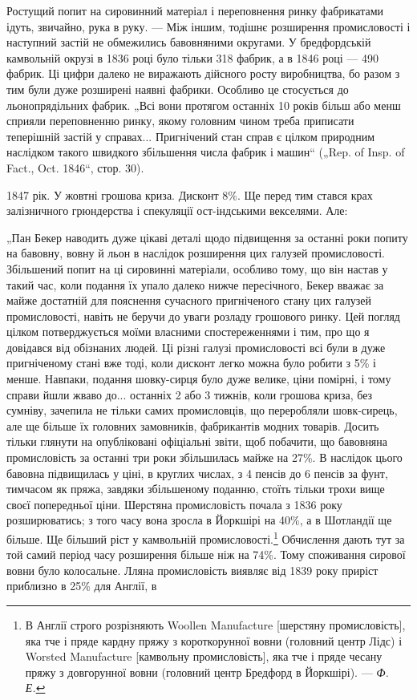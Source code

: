
Ростущий попит на сировинний матеріал і переповнення
ринку фабрикатами ідуть, звичайно, рука в руку. — Між іншим,
тодішнє розширення промисловості і наступний застій не обмежились
бавовняними округами. У бредфордській камвольній
окрузі в 1836 році було тільки 318 фабрик, а в 1846 році —
490 фабрик. Ці цифри далеко не виражають дійсного росту
виробництва, бо разом з тим були дуже розширені наявні фабрики.
Особливо це стосується до льонопрядільних фабрик. „Всі
вони протягом останніх 10 років більш або менш сприяли переповненню
ринку, якому головним чином треба приписати теперішній
застій у справах... Пригнічений стан справ є цілком природним
наслідком такого швидкого збільшення числа фабрик
і машин“ („Rep. of Insp. of Fact., Oct. 1846“, стор. 30).

1847 рік. У жовтні грошова криза. Дисконт 8\%. Ще перед
тим стався крах залізничного грюндерства і спекуляції ост-індськими
векселями. Але:

„Пан Бекер наводить дуже цікаві деталі щодо підвищення
за останні роки попиту на бавовну, вовну й льон в наслідок
розширення цих галузей промисловості. Збільшений попит на ці
сировинні матеріали, особливо тому, що він настав у такий час,
коли подання їх упало далеко нижче пересічного, Бекер вважає
за майже достатній для пояснення сучасного пригніченого стану
цих галузей промисловості, навіть не беручи до уваги розладу
грошового ринку. Цей погляд цілком потверджується моїми
власними спостереженнями і тим, про що я довідався від обізнаних
людей. Ці різні галузі промисловості всі були в дуже
пригніченому стані вже тоді, коли дисконт легко можна було
робити з 5\% і менше. Навпаки, подання шовку-сирця було дуже
велике, ціни помірні, і тому справи йшли жваво до... останніх
2 або 3 тижнів, коли грошова криза, без сумніву, зачепила не
тільки самих промисловців, що переробляли шовк-сирець, але
ще більше їх головних замовників, фабрикантів модних товарів.
Досить тільки глянути на опубліковані офіціальні звіти, щоб побачити,
що бавовняна промисловість за останні три роки збільшилась
майже на 27\%. В наслідок цього бавовна підвищилась
у ціні, в круглих числах, з 4 пенсів до 6 пенсів за фунт, тимчасом
як пряжа, завдяки збільшеному поданню, стоїть тільки
трохи вище своєї попередньої ціни. Шерстяна промисловість почала
з 1836 року розширюватись; з того часу вона зросла в
Йоркшірі на 40\%, а в Шотландії ще більше. Ще більший ріст
у камвольній промисловості.\footnote{
В Англії строго розрізняють Woollen Manufacture [шерстяну промисловість],
яка тче і пряде кардну пряжу з короткорунної вовни (головний центр Лідс)
і Worsted Manufacture [камвольну промисловість], яка тче і пряде чесану пряжу
з довгорунної вовни (головний центр Бредфорд в Йоркшірі). — \emph{Ф. Е.}
} Обчислення дають тут за той
самий період часу розширення більше ніж на 74\%. Тому споживання
сирової вовни було колосальне. Лляна промисловість виявляє
від 1839 року приріст приблизно в 25\% для Англії, в
\parbreak{}  %
